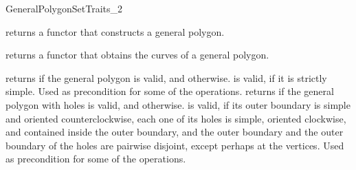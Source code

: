 \begin{ccRefConcept}{GeneralPolygonSetTraits_2}

{returns a functor that constructs a general polygon.}

{returns a functor that obtains the curves of a general polygon.}

{returns  if the general polygon  is valid, 
and  otherwise.  is valid, if it is strictly simple.
Used as precondition for some of the operations.}
\ccGlue
{}
{returns  if the general polygon with holes  
is valid, and  otherwise.  is valid, if
its outer boundary is simple and oriented counterclockwise, each one of 
its holes is simple, oriented clockwise, and contained inside the outer 
boundary, and the outer boundary and the outer boundary of the holes are 
pairwise disjoint, except perhaps at the vertices. Used as precondition 
for some of the operations.}

\ccHasModels
\\
\\

\ccSeeAlso
\ccSeeAlso
  \\

\end{ccRefConcept}

\ccRefPageEnd
